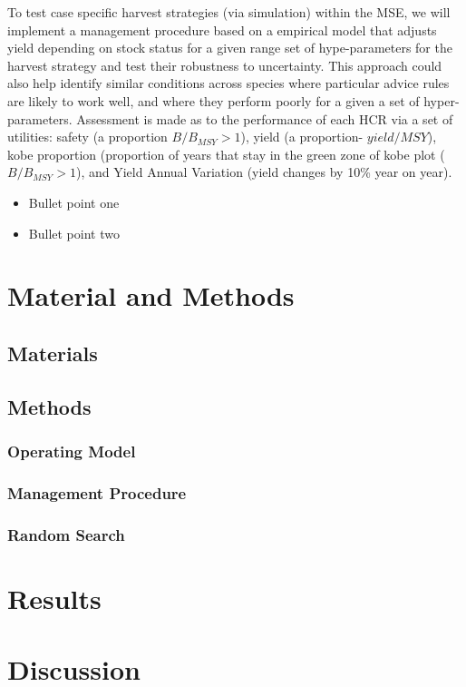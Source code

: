 \documentclass[preprint,12pt]{elsarticle}
\begin{document}
To test case specific harvest strategies (via simulation) within the MSE, we will implement a management procedure based on a empirical model that adjusts yield depending on stock status for a given range set of hype-parameters for the harvest strategy and test their robustness to uncertainty.  This approach could also help identify similar conditions across species where particular advice rules are likely to work well, and where they perform poorly for a given a set of hyper-parameters. Assessment is made as to the performance of each HCR via a set of utilities: safety (a proportion $B/B_{MSY} >1$), yield (a proportion- $yield/MSY$), kobe proportion (proportion of years that stay in the green zone of kobe plot ($B/B_{MSY} >1$), and Yield Annual Variation (yield changes by 10\% year on year).  

\begin{itemize}
\item Bullet point one
\item Bullet point two
\end{itemize}


\section{Material and Methods}
\subsection{Materials}
\subsection{Methods}
\subsubsection{Operating Model}
\subsubsection{Management Procedure}

\subsubsection{Random Search}


\section{Results}
\section{Discussion}
\end{document}
